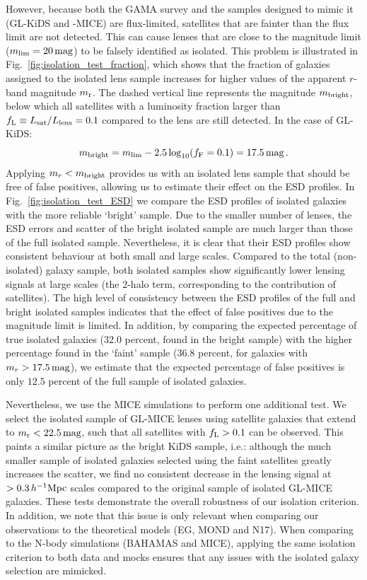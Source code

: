 \documentclass[usenatbib]{mnras}
\newcommand{\hMpc}{\, h^{-1}{\rm{Mpc}} }
\newcommand{\magn}{\, {\rm mag} }
\newcommand{\un}[1]{_{\rm #1}}
\begin{document}
However, because both the GAMA survey and the samples designed to mimic it (GL-KiDS and -MICE) are flux-limited, satellites that are fainter than the flux limit are not detected. This can cause lenses that are close to the magnitude limit ($m\un{lim}=20 \magn$) to be falsely identified as isolated. This problem is illustrated in Fig.~\ref{fig:isolation_test_fraction}, which shows that the fraction of galaxies assigned to the isolated lens sample increases for higher values of the apparent $r$-band magnitude $m\un{r}$. The dashed vertical line represents the magnitude $m\un{bright}$, below which all satellites with a luminosity fraction larger than $f\un{L} \equiv L\un{sat}/L\un{lens}=0.1$ compared to the lens are still detected. In the case of GL-KiDS:
\begin{equation}
	m\un{bright} = m\un{lim} - 2.5 \log_{10}(f\un{F}=0.1) = 17.5 \magn \, .
\end{equation}
Applying $m_r < m\un{bright}$ provides us with an isolated lens sample that should be free of false positives, allowing us to estimate their effect on the ESD profiles. In Fig.~\ref{fig:isolation_test_ESD} we compare the ESD profiles of isolated galaxies with the more reliable `bright' sample. Due to the smaller number of lenses, the ESD errors and scatter of the bright isolated sample are much larger than those of the full isolated sample. Nevertheless, it is clear that their ESD profiles show consistent behaviour at both small and large scales. Compared to the total (non-isolated) galaxy sample, both isolated samples show significantly lower lensing signals at large scales (the 2-halo term, corresponding to the contribution of satellites). The high level of consistency between the ESD profiles of the full and bright isolated samples indicates that the effect of false positives due to the magnitude limit is limited. In addition, by comparing the expected percentage of true isolated galaxies ($32.0$ percent, found in the bright sample) with the higher percentage found in the `faint' sample ($36.8$ percent, for galaxies with $m_r > 17.5 \magn$), we estimate that the expected percentage of false positives is only $12.5$ percent of the full sample of isolated galaxies.

Nevertheless, we use the MICE simulations to perform one additional test. We select the isolated sample of GL-MICE lenses using satellite galaxies that extend to $m\un{r}<22.5 \magn$, such that all satellites with $f\un{L}>0.1$ can be observed. This paints a similar picture as the bright KiDS sample, i.e.: although the much smaller sample of isolated galaxies selected using the faint satellites greatly increases the scatter, we find no consistent decrease in the lensing signal at $>0.3\hMpc$ scales compared to the original sample of isolated GL-MICE galaxies. These tests demonstrate the overall robustness of our isolation criterion. In addition, we note that this issue is only relevant when comparing our observations to the theoretical models (EG, MOND and N17). When comparing to the N-body simulations (BAHAMAS and MICE), applying the same isolation criterion to both data and mocks ensures that any issues with the isolated galaxy selection are mimicked.
\end{document}
